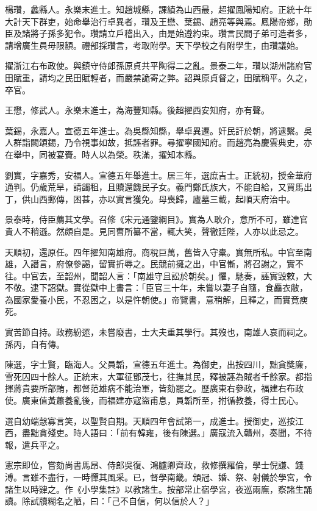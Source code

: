 \begin{pinyinscope}
楊瓚，蠡縣人。永樂末進士。知趙城縣，課績為山西最，超擢鳳陽知府。正統十年大計天下群吏，始命舉治行卓異者，瓚及王懋、葉錫、趙亮等與焉。鳳陽帝鄉，勛臣及諸將子孫多犯令。瓚請立戶稽出入，由是始遵約束。瓚言民間子弟可造者多，請增廣生員毋限額。禮部採瓚言，考取附學。天下學校之有附學生，由瓚議始。

擢浙江右布政使。與鎮守侍郎孫原貞共平陶得二之亂。景泰二年，瓚以湖州諸府官田賦重，請均之民田賦輕者，而嚴禁詭寄之弊。詔與原貞督之，田賦稱平。久之，卒官。

王懋，修武人。永樂末進士，為海豐知縣。後超擢西安知府，亦有聲。

葉錫，永嘉人。宣德五年進士。為吳縣知縣，舉卓異遷。奸民訐於朝，將逮繫。吳人群詣闕頌錫，乃令視事如故，抵誣者罪。尋擢寧國知府。而趙亮為慶雲典史，亦在舉中，同被宴賚。時人以為榮。秩滿，擢知本縣。

劉實，字嘉秀，安福人。宣德五年舉進士。居三年，選庶吉士。正統初，授金華府通判。仍歲荒旱，請蠲租，且贖還饑民子女。義門鄭氏族大，不能自給，又買馬出丁，供山西郵傳，困甚，亦以實言獲免。母喪歸，廬墓三載，起順天府治中。

景泰時，侍臣薦其文學。召修《宋元通鑒綱目》。實為人耿介，意所不可，雖達官貴人不稍遜。然頗自是。見同曹所纂不當，輒大笑，聲徹廷陛，人亦以此忌之。

天順初，還原任。四年擢知南雄府。商稅巨萬，舊皆入守橐。實無所私。中官至南雄，入譖言，府僚參謁，留實折辱之。民競前擁之出，中官慚，將召謝之，實不往。中官去，至韶州，聞韶人言：「南雄守且訟於朝矣。」懼，馳奏，誣實毀敕，大不敬。逮下詔獄。實從獄中上書言：「臣官三十年，未嘗以妻子自隨，食麤衣敝，為國家愛養小民，不忍困之，以是忤朝使。」帝覽書，意稍解，且釋之，而實竟瘐死。

實苦節自持。政務紛遝，未嘗廢書，士大夫重其學行。其歿也，南雄人哀而祠之。孫丙，自有傳。

陳選，字士賢，臨海人。父員韜，宣德五年進士。為御史，出按四川，黜貪獎廉，雪死囚四十餘人。正統末，大軍征鄧茂七，往撫其民，釋被誣為賊者千餘家。都指揮蔣貴要所部賄，都督范雄病不能治軍，皆劾罷之。歷廣東右參政，福建右布政使。廣東值黃蕭養亂後，而福建亦寇盜甫息，員韜所至，拊循教養，得士民心。

選自幼端愨寡言笑，以聖賢自期。天順四年會試第一，成進士。授御史，巡按江西，盡黜貪殘吏。時人語曰：「前有韓雍，後有陳選。」廣寇流入贛州，奏聞，不待報，遣兵平之。

憲宗即位，嘗劾尚書馬昂、侍郎吳復、鴻臚卿齊政，救修撰羅倫，學士倪謙、錢溥。言雖不盡行，一時憚其風采。已，督學南畿。頒冠、婚、祭、射儀於學宮，令諸生以時肄之。作《小學集註》以教諸生。按部常止宿學宮，夜巡兩廡，察諸生誦讀。除試牘糊名之陋，曰：「己不自信，何以信於人？」


\end{pinyinscope}
